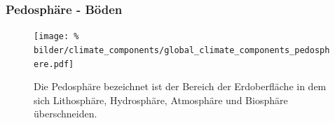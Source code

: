 \begin{frame}
	\frametitle{Pedosphäre - Böden}

	\begin{figure}
		\centering
		\texttt{[image: \%
        bilder/climate\_components/global\_climate\_components\_pedosphere.pdf]}
		\caption{Die Pedosphäre bezeichnet ist der Bereich der Erdoberfläche in dem sich Lithosphäre, Hydrosphäre, Atmosphäre und Biosphäre überschneiden.}
	\end{figure}

\end{frame}
